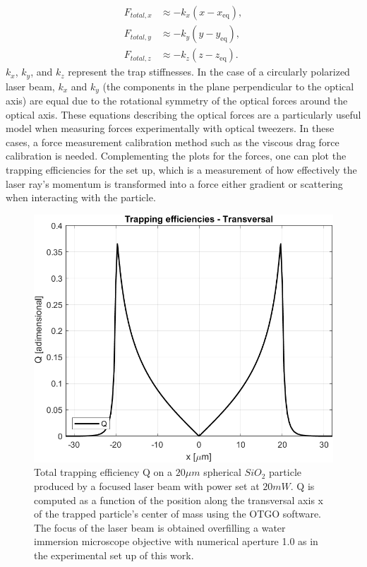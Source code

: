 \documentclass[letterpaper,12pt,oneside]{book}
\begin{document}
\begin{equation}
\begin{aligned}
F_{total,x} & \approx -k_x (x - x_{\text{eq}}), \\
F_{total,y} & \approx -k_y (y - y_{\text{eq}}), \\
F_{total,z} & \approx -k_z (z - z_{\text{eq}}).
\end{aligned}
\end{equation}
$k_x$, $k_y$, and $k_z$ represent the trap stiffnesses. In the case of a circularly polarized laser beam, $k_x$ and $k_y$  (the components in the plane perpendicular to the optical axis) are equal due to the rotational symmetry of the optical forces around the optical axis. These equations describing the optical forces are a particularly useful model when measuring forces experimentally with optical tweezers. In these cases, a force measurement calibration method such as the viscous drag force calibration is needed.
Complementing the plots for the forces, one can plot the trapping efficiencies for the set up, which is a measurement of how effectively the laser ray's momentum is transformed into a force either gradient or scattering when interacting with the particle.
\begin{figure}[H]
    \centering
    \includegraphics[scale=0.7]{OTGO/total efficienci.png}
    \caption{Total trapping efficiency Q on a $20 \mu m$ spherical $SiO_2$ particle produced by a focused laser beam with power set at $20 mW$. Q is computed as a function of the position along the transversal axis x of the trapped particle's center of mass using the OTGO software. The focus of the laser beam is obtained overfilling a water immersion microscope objective with numerical aperture 1.0 as in the experimental set up of this work.}
    \label{fig:enter-label}
\end{figure}
\end{document}
